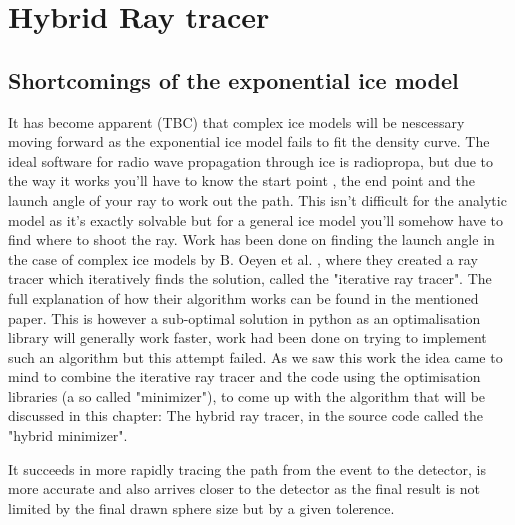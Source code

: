 \documentclass[11pt,a4paper,faculty=we,language=en,doctype=report]{cls/ugent-doc}
\begin{document}
\chapter{Hybrid Ray tracer}
\section{Shortcomings of the exponential ice model}
It has become apparent (TBC) that complex ice models will be nescessary moving
forward as the exponential ice model fails to fit the density curve.  The ideal
software for radio wave propagation through ice is radiopropa\cite{Winchen_2019}, 
but due to the way it works you'll have to
know the start point , the end point and the launch angle of your ray to work
out the path. This isn't difficult for the analytic model as it's exactly solvable
but for a general ice model you'll somehow have to find where to shoot the ray.
Work has been done on finding the launch angle in the case of complex
ice models by B. Oeyen et al. \cite{2022icrc.confE1027O}, where they
created a ray tracer which iteratively finds the solution, called the
"iterative ray tracer".  The full explanation of how their algorithm works can
be found in the mentioned paper.  This is however a sub-optimal solution in
python as an optimalisation library will generally work faster, work had been
done on trying to implement such an algorithm but this attempt failed.  As we
saw this work the idea came to mind to combine the iterative ray tracer and the code
using the optimisation libraries (a so called "minimizer"), to come up with the
algorithm that will be discussed in this chapter: The hybrid ray tracer, in the
source code called the "hybrid minimizer".

It succeeds in more rapidly tracing the path from the event to the detector, is
more accurate and also arrives closer to the detector as the final result is
not limited by the final drawn sphere size but by a given tolerence.
\end{document}
